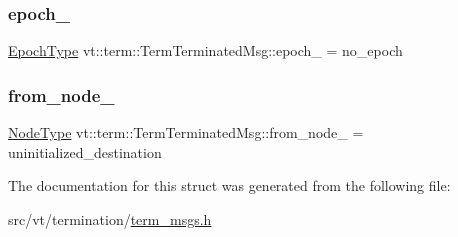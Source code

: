 \subsubsection{\texorpdfstring{epoch\+\_\+}{epoch\_}}
{\footnotesize\ttfamily \hyperlink{namespacevt_a81d11b28122d43bf9834577e4a06440f}{Epoch\+Type} vt\+::term\+::\+Term\+Terminated\+Msg\+::epoch\+\_\+ = no\+\_\+epoch\hspace{0.3cm}{\ttfamily [private]}}

\mbox{\label{structvt_1_1term_1_1_term_terminated_msg_a393564a84f3a77e1ab7b31ee8c368d5b}} 
\subsubsection{\texorpdfstring{from\+\_\+node\+\_\+}{from\_node\_}}
{\footnotesize\ttfamily \hyperlink{namespacevt_a866da9d0efc19c0a1ce79e9e492f47e2}{Node\+Type} vt\+::term\+::\+Term\+Terminated\+Msg\+::from\+\_\+node\+\_\+ = uninitialized\+\_\+destination\hspace{0.3cm}{\ttfamily [private]}}



The documentation for this struct was generated from the following file\+:\begin{DoxyCompactItemize}
\item 
src/vt/termination/\hyperlink{term__msgs_8h}{term\+\_\+msgs.\+h}\end{DoxyCompactItemize}
